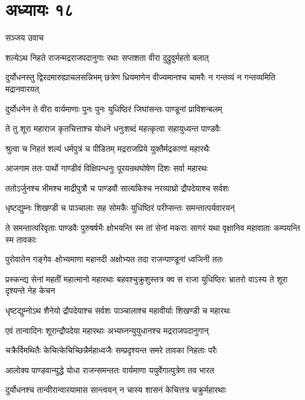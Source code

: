 \chapter{अध्यायः १८}
\twolineshloka
{सञ्जय उवाच}
{}


\twolineshloka
{शल्येऽथ निहते राजन्मद्रराजपदानुगाः}
{रथाः सप्तशता वीरा दुद्रुवुर्महतो बलात्}


\threelineshloka
{दुर्योधनस्तु द्विरदमारुह्याचलसन्निभम्}
{छत्रेण ध्रियमाणेन वीज्यमानश्च चामरैः}
{न गन्तव्यं न गन्तव्यमिति मद्रानवारयत्}


\twolineshloka
{दुर्योधनेन ते वीरा वार्यमाणाः पुनः पुनः}
{युधिष्ठिरं जिघांसन्तः पाण्डूनां प्राविशन्बलम्}


\twolineshloka
{ते तु शूरा महाराज कृतचित्ताश्च योधने}
{धनुःशब्दं महत्कृत्वा सहायुध्यन्त पाण्डवैः}


\twolineshloka
{श्रुत्वा च निहतं शल्यं धर्मपुत्रं च पीडितम्}
{मद्रराजप्रिये युक्तैर्मद्रकाणां महारथैः}


\twolineshloka
{आजगाम ततः पार्थो गाण्डीवं विक्षिपन्धनुः}
{पूरयन्रथघोषेण दिशः सर्वा महारथः}


\twolineshloka
{ततोऽर्जुनश्च भीमश्च माद्रीपुत्रौ च पाण्डवौ}
{सात्यकिश्च नरव्याघ्रो द्रौपदेयाश्च सर्वशः}


\twolineshloka
{धृष्टद्युम्नः शिखण्डी च पाञ्चालाः सह सोमकैः}
{युधिष्ठिरं परीप्सन्तः समन्तात्पर्यवारयन्}


\threelineshloka
{ते समन्तात्परिवृताः पाण्डवैः पुरुषर्षभैः}
{क्षोभयन्ति स्म तां सेनां मकराः सागरं यथा}
{वृक्षानिव महावाताः कम्पयन्ति स्म तावकाः}


\twolineshloka
{पुरोवातेन गङ्गेव--क्षोभ्यमाणा महानदी}
{अक्षोभ्यत तदा राजन्पाण्डूनां ध्वजिनी ततः}


\threelineshloka
{प्रस्कन्द्य सेनां महतीं महात्मानो महारथाः}
{बहवश्चुक्रुशुस्तत्र क्व स राजा युधिष्ठिरः}
{भ्रातरो वाऽस्य ते शूरा दृश्यन्ते नेह केचन}


\twolineshloka
{धृष्टद्युम्नोऽथ शैनेयो द्रौपदेयाश्च सर्वशः}
{पाञ्चालाश्च महावीर्याः शिखण्डी च महारथः}


\twolineshloka
{एवं तान्वादिनः शूरान्द्रौपदेया महारथाः}
{अभ्यघ्नन्युयुधानश्च मद्रराजपदानुगान्}


\twolineshloka
{चक्रैर्विमथितैः केचित्केचिच्छिन्नैर्महाध्वजैः}
{सम्प्रदृश्यन्त समरे तावका निहताः परैः}


\twolineshloka
{आलोक्य पाण्डवान्युद्धे योधा राजन्समन्ततः}
{वार्यमाणा ययुर्वेगात्पुत्रेण तव भारत}


\twolineshloka
{दुर्योधनश्च तान्वीरान्वारयामास सान्त्वयन्}
{न चास्य शासनं केचित्तत्र चक्रुर्महारथाः}


